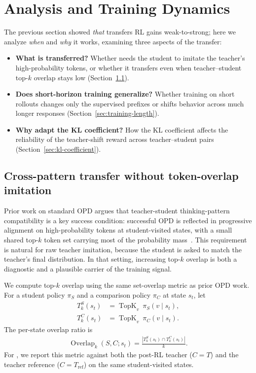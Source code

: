 
\section{Analysis and Training Dynamics}

The previous section showed \emph{that} \method{} transfers RL gains
weak-to-strong; here we analyze \emph{when} and \emph{why} it works, examining
three aspects of the transfer:
\begin{itemize}
    \item \textbf{What is transferred?} Whether \method{} needs the student to
    imitate the teacher's high-probability tokens, or whether it transfers even
    when teacher--student top-$k$ overlap stays low
    (Section~\ref{sec:cross-pattern}).
    \item \textbf{Does short-horizon training generalize?} Whether training on
    short rollouts changes only the supervised prefixes or shifts behavior across
    much longer responses (Section~\ref{sec:training-length}).
    \item \textbf{Why adapt the KL coefficient?} How the KL coefficient affects
    the reliability of the teacher-shift reward across teacher--student pairs
    (Section~\ref{sec:kl-coefficient}).
\end{itemize}

\subsection{Cross-pattern transfer without token-overlap imitation}
\label{sec:cross-pattern}

Prior work on standard OPD argues that teacher-student thinking-pattern
compatibility is a key success condition: successful OPD is reflected in
progressive alignment on high-probability tokens at student-visited states, with
a small shared top-$k$ token set carrying most of the probability
mass~\citep{li2026rethinkingopd}. This requirement is natural for raw teacher
imitation, because the student is asked to match the teacher's final
distribution. In that setting, increasing top-$k$ overlap is both a diagnostic
and a plausible carrier of the training signal.

We compute top-$k$ overlap using the same set-overlap metric as prior OPD work.
For a student policy $\pi_S$ and a comparison policy $\pi_C$ at state $s_t$, let
\begin{align}
    T_k^S(s_t) &= \operatorname{TopK}_{v}\ \pi_S(v\mid s_t), \\
    T_k^C(s_t) &= \operatorname{TopK}_{v}\ \pi_C(v\mid s_t).
\end{align}
The per-state overlap ratio is
\begin{align}
    \operatorname{Overlap}_k(S,C;s_t)
    =
    \frac{\left|T_k^S(s_t)\cap T_k^C(s_t)\right|}{k}.
\end{align}
For \method{}, we report this metric against both the post-RL teacher
($C=T$) and the teacher reference ($C=T_{\mathrm{ref}}$) on the same
student-visited states.


